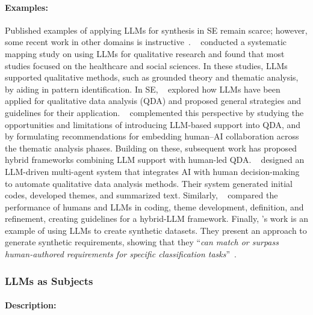\documentclass[smallextended]{svjour3}
\newcommand*{\enq}[1]{\enquote{{\itshape#1}}}
\newcommand{\studytypesubsection}[1]{\subsubsection{#1}}
\newcommand{\studytypeparagraph}[1]{\paragraph{\bfseries #1:}}
\newcommand{\studytypesubsection}[1]{\subsection{#1}}
\newcommand{\studytypeparagraph}[1]{\subsubsection{#1}}
\begin{document}
\studytypeparagraph{Examples} 

Published examples of applying LLMs for synthesis in SE remain scarce; however, some recent work in other domains is instructive~\cite{DBLP:journals/ase/BanoHZT24}.
\citeauthor{DBLP:conf/wsese/BarrosANKKNB25}~\cite{DBLP:conf/wsese/BarrosANKKNB25} conducted a systematic mapping study on using LLMs for qualitative research and found that most studies focused on the healthcare and social sciences. In these studies, LLMs supported qualitative methods, such as grounded theory and thematic analysis, by aiding in pattern identification.
In SE, \citeauthor{DBLP:conf/wsese/LecaVSS25}~\cite{DBLP:conf/wsese/LecaVSS25} explored how LLMs have been applied for qualitative data analysis (QDA) and proposed general strategies and guidelines for their application. \citeauthor{DBLP:journals/corr/abs-2511-14528}~\cite{DBLP:journals/corr/abs-2511-14528} complemented this perspective by studying the opportunities and limitations of introducing LLM-based support into QDA, and by formulating recommendations for embedding human–AI collaboration across the thematic analysis phases. Building on these, subsequent work has proposed hybrid frameworks combining LLM support with human-led QDA. \citeauthor{DBLP:journals/corr/abs-2402-01386}~\cite{DBLP:journals/corr/abs-2402-01386} designed an LLM-driven multi-agent system that integrates AI with human decision-making to automate qualitative data analysis methods. Their system generated initial codes, developed themes, and summarized text. Similarly, \citeauthor{DBLP:journals/corr/abs-2510-18456}~\cite{DBLP:journals/corr/abs-2510-18456} compared the performance of humans and LLMs in coding, theme development, definition, and refinement, creating guidelines for a hybrid-LLM framework.
Finally, \citeauthor{DBLP:journals/corr/abs-2506-21138}'s work is an example of using LLMs to create synthetic datasets.
They present an approach to generate synthetic requirements, showing that they \enq{can match or surpass human-authored requirements for specific classification tasks}~\cite{DBLP:journals/corr/abs-2506-21138}.
 
\studytypesubsection{LLMs as Subjects}
\label{sec:llms-as-subjects}

\studytypeparagraph{Description}
\end{document}
